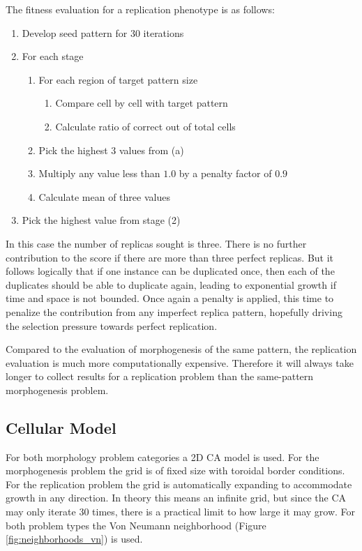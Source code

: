 The fitness evaluation for a replication phenotype is as follows:

\begin{enumerate}
    \item Develop seed pattern for 30 iterations
    \item For each stage
        \begin{enumerate}
            \item For each region of target pattern size
            \begin{enumerate}
                \item Compare cell by cell with  target pattern
                \item Calculate ratio of correct out of total cells
            \end{enumerate}
            \item Pick the highest 3 values from (a)
            \item Multiply any value less than $1.0$ by a penalty factor of $0.9$
            \item Calculate mean of three values
        \end{enumerate}
    \item Pick the highest value from stage (2)
\end{enumerate}

In this case the number of replicas sought is three.
There is no further contribution to the score if there are more than three perfect replicas.
But it follows logically that if one instance can be duplicated once, then each of the duplicates should be able to duplicate again, leading to exponential growth if time and space is not bounded.
Once again a penalty is applied, this time to penalize the contribution from any imperfect replica pattern, hopefully driving the selection pressure towards perfect replication.

Compared to the evaluation of morphogenesis of the same pattern, the replication evaluation is much more computationally expensive.
Therefore it will always take longer to collect results for a replication problem than the same-pattern morphogenesis problem.

\subsection{Cellular Model}
For both morphology problem categories a 2D CA model is used.
For the morphogenesis problem the grid is of fixed size with toroidal border conditions.
For the replication problem the grid is automatically expanding to accommodate growth in any direction.
In theory this means an infinite grid, but since the CA may only iterate 30 times, there is a practical limit to how large it may grow.
For both problem types the Von Neumann neighborhood (Figure \ref{fig:neighborhoods_vn}) is used.

